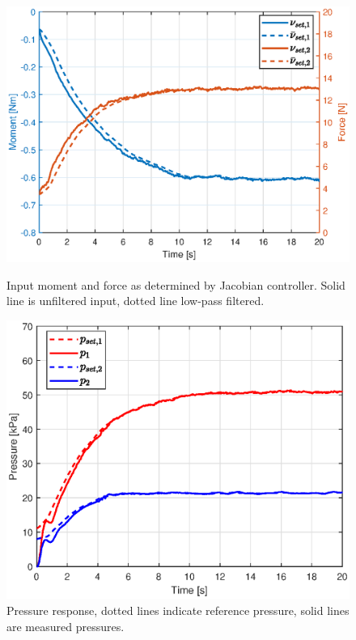 \begin{figure}[H] 
    \begin{minipage}[b]{0.49\linewidth}
     \centering
    \includegraphics[width=\linewidth]{Figures/Chapter5/nuleft.eps} 
    \caption{Input moment and force as determined by Jacobian controller. Solid line is unfiltered input, dotted line low-pass filtered. } 
    \label{fig3:dim} 
       \end{minipage} 
    \begin{minipage}[b]{0.49\linewidth}
     \centering
    \includegraphics[width=\linewidth]{Figures/Chapter5/pressureleft.eps} 
    \caption{Pressure response, dotted lines indicate reference pressure, solid lines are measured pressures.} 
    \label{fig3:FemModel} 
    \end{minipage} 
\end{figure}




